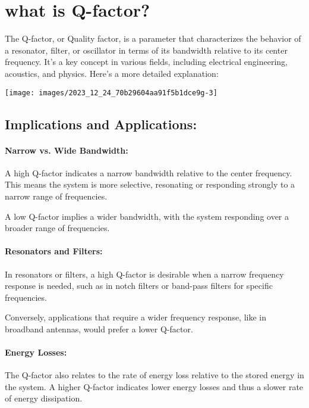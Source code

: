 \section{what is Q-factor?}

The Q-factor, or Quality factor, is a parameter that characterizes the behavior of a resonator, filter, or oscillator in terms of its bandwidth relative to its center frequency. It's a key concept in various fields, including electrical engineering, acoustics, and physics. Here's a more detailed explanation:

\begin{center}
\texttt{[image: images/2023\_12\_24\_70b29604aa91f5b1dce9g-3]}
\end{center}

\subsection{Implications and Applications:}

\paragraph{Narrow vs. Wide Bandwidth:}

A high Q-factor indicates a narrow bandwidth relative to the center frequency. This means the system is more selective, resonating or responding strongly to a narrow range of frequencies.

A low Q-factor implies a wider bandwidth, with the system responding over a broader range of frequencies.

\paragraph{Resonators and Filters:}

In resonators or filters, a high Q-factor is desirable when a narrow frequency response is needed, such as in notch filters or band-pass filters for specific frequencies.

Conversely, applications that require a wider frequency response, like in broadband antennas, would prefer a lower Q-factor.

\paragraph{Energy Losses:}

The Q-factor also relates to the rate of energy loss relative to the stored energy in the system. A higher $\mathrm{Q}$-factor indicates lower energy losses and thus a slower rate of energy dissipation.

